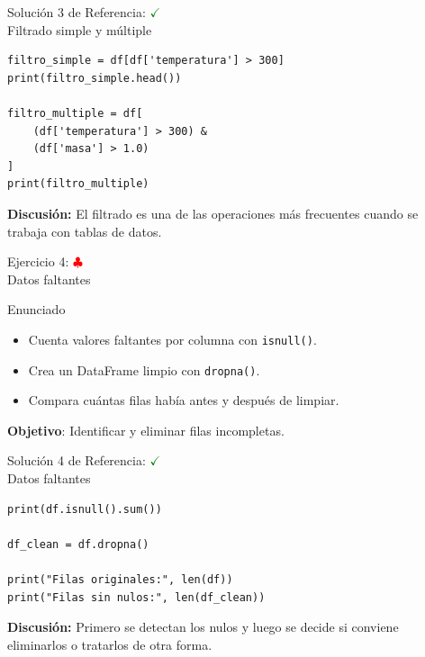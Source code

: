\documentclass[10pt]{beamer}
\begin{document}
\begin{solutionblock}
\begin{frame}[fragile]{Solución 3 de Referencia: \hfill \textcolor{green}{$\checkmark$} \\ Filtrado simple y múltiple}
\begin{verbatim}
filtro_simple = df[df['temperatura'] > 300]
print(filtro_simple.head())

filtro_multiple = df[
    (df['temperatura'] > 300) &
    (df['masa'] > 1.0)
]
print(filtro_multiple)
\end{verbatim}
\textbf{Discusión:} El filtrado es una de las operaciones más frecuentes cuando se trabaja con tablas de datos.
\end{frame}
\end{solutionblock}

\begin{frame}{Ejercicio 4: \hfill \textcolor{red}{$\clubsuit$} \\ Datos faltantes}
  \begin{block}{Enunciado}
    \begin{itemize}
      \item Cuenta valores faltantes por columna con \texttt{isnull()}.
      \item Crea un DataFrame limpio con \texttt{dropna()}.
      \item Compara cuántas filas había antes y después de limpiar.
    \end{itemize}
  \end{block}
  \textbf{Objetivo}: Identificar y eliminar filas incompletas.
\end{frame}

\begin{solutionblock}
\begin{frame}[fragile]{Solución 4 de Referencia: \hfill \textcolor{green}{$\checkmark$} \\ Datos faltantes}
\begin{verbatim}
print(df.isnull().sum())

df_clean = df.dropna()

print("Filas originales:", len(df))
print("Filas sin nulos:", len(df_clean))
\end{verbatim}
\textbf{Discusión:} Primero se detectan los nulos y luego se decide si conviene eliminarlos o tratarlos de otra forma.
\end{frame}
\end{solutionblock}
\end{document}
